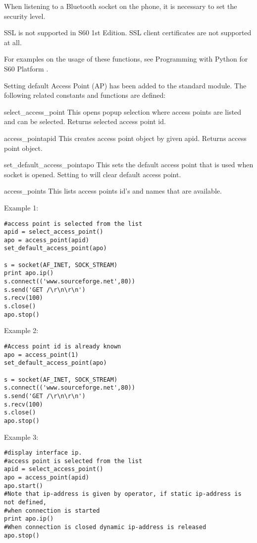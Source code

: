 \begin{notice}[note]
When listening to a Bluetooth socket on the phone, it is necessary to set 
the security level.
\end{notice}

\begin{notice}[note]
SSL is not supported in S60 1st Edition. SSL client certificates are 
not supported at all.
\end{notice}

For examples on the usage of these functions, see Programming with Python for 
S60 Platform \cite{PyS60Prog}.

Setting default Access Point (AP) has been added to the standard  
module. The following related constants and functions are defined:

\begin{funcdesc}{select_access_point}{}
This opens popup selection where access points are listed and can be selected.
Returns selected access point id.
\end{funcdesc}

\begin{funcdesc}{access_point}{apid}
This creates access point object by given apid. Returns access point object.
\end{funcdesc}

\begin{funcdesc}{set_default_access_point}{apo}
This sets the default access point that is used when socket is opened. Setting 
 to  will clear default access point.
\end{funcdesc}

\begin{funcdesc}{access_points}{}
This lists access points id's and names that are available. 
\end{funcdesc}

Example 1:
\begin{verbatim}
#access point is selected from the list
apid = select_access_point()
apo = access_point(apid)
set_default_access_point(apo)

s = socket(AF_INET, SOCK_STREAM)
print apo.ip()
s.connect(('www.sourceforge.net',80))
s.send('GET /\r\n\r\n')
s.recv(100)
s.close()
apo.stop()

\end{verbatim}

Example 2:
\begin{verbatim}
#Access point id is already known
apo = access_point(1)
set_default_access_point(apo) 

s = socket(AF_INET, SOCK_STREAM)
s.connect(('www.sourceforge.net',80))
s.send('GET /\r\n\r\n')
s.recv(100)
s.close()
apo.stop()
\end{verbatim}

Example 3:
\begin{verbatim}
#display interface ip.
#access point is selected from the list
apid = select_access_point()
apo = access_point(apid)
apo.start()
#Note that ip-address is given by operator, if static ip-address is not defined,
#when connection is started
print apo.ip()
#When connection is closed dynamic ip-address is released
apo.stop()
\end{verbatim}

